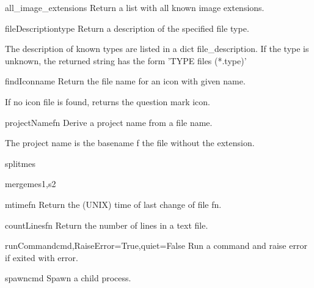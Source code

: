 \begin{funcdesc}{all_image_extensions}{}
Return a list with all known image extensions.
\end{funcdesc}

\begin{funcdesc}{fileDescription}{type}
Return a description of the specified file type.

    The description of known types are listed in a dict file_description.
    If the type is unknown, the returned string has the form
    'TYPE files (*.type)'
    
\end{funcdesc}

\begin{funcdesc}{findIcon}{name}
Return the file name for an icon with given name.

    If no icon file is found, returns the question mark icon.
    
\end{funcdesc}

\begin{funcdesc}{projectName}{fn}
Derive a project name from a file name.

    The project name is the basename f the file without the extension.
    
\end{funcdesc}

\begin{funcdesc}{splitme}{s}

\end{funcdesc}

\begin{funcdesc}{mergeme}{s1,s2}

\end{funcdesc}

\begin{funcdesc}{mtime}{fn}
Return the (UNIX) time of last change of file fn.
\end{funcdesc}

\begin{funcdesc}{countLines}{fn}
Return the number of lines in a text file.
\end{funcdesc}

\begin{funcdesc}{runCommand}{cmd,RaiseError=True,quiet=False}
Run a command and raise error if exited with error.
\end{funcdesc}

\begin{funcdesc}{spawn}{cmd}
Spawn a child process.
\end{funcdesc}


